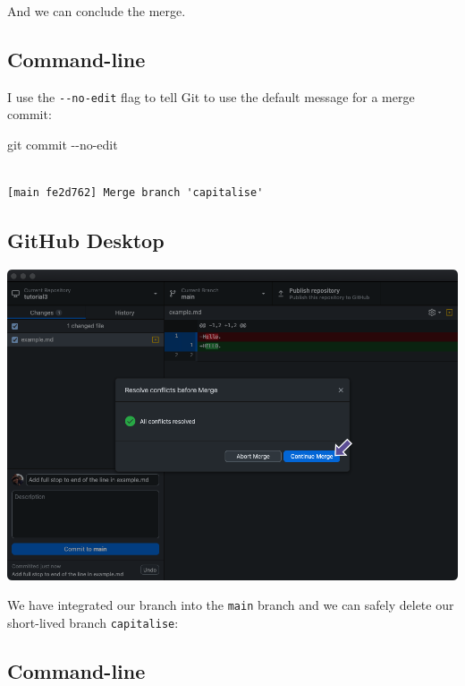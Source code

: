 \documentclass[
  letterpaper,
  DIV=11,
  numbers=noendperiod]{scrartcl}
\newenvironment{Shaded}{\begin{snugshade}}{\end{snugshade}}
\newcommand{\AttributeTok}[1]{\textcolor[rgb]{0.40,0.45,0.13}{#1}}
\newcommand{\FunctionTok}[1]{\textcolor[rgb]{0.28,0.35,0.67}{#1}}
\newcommand{\NormalTok}[1]{\textcolor[rgb]{0.00,0.23,0.31}{#1}}
\begin{document}
And we can conclude the merge.

\subsection{Command-line}

I use the \texttt{-\/-no-edit} flag to tell Git to use the default
message for a merge commit:

\begin{Shaded}
\begin{Highlighting}[]

\FunctionTok{git}\NormalTok{ commit }\AttributeTok{{-}{-}no{-}edit}
\end{Highlighting}
\end{Shaded}

\begin{verbatim}

[main fe2d762] Merge branch 'capitalise'
\end{verbatim}

\subsection{GitHub Desktop}

\includegraphics{images/image56.png}

We have integrated our branch into the \texttt{main} branch and we can
safely delete our short-lived branch \texttt{capitalise}:

\subsection{Command-line}
\end{document}
